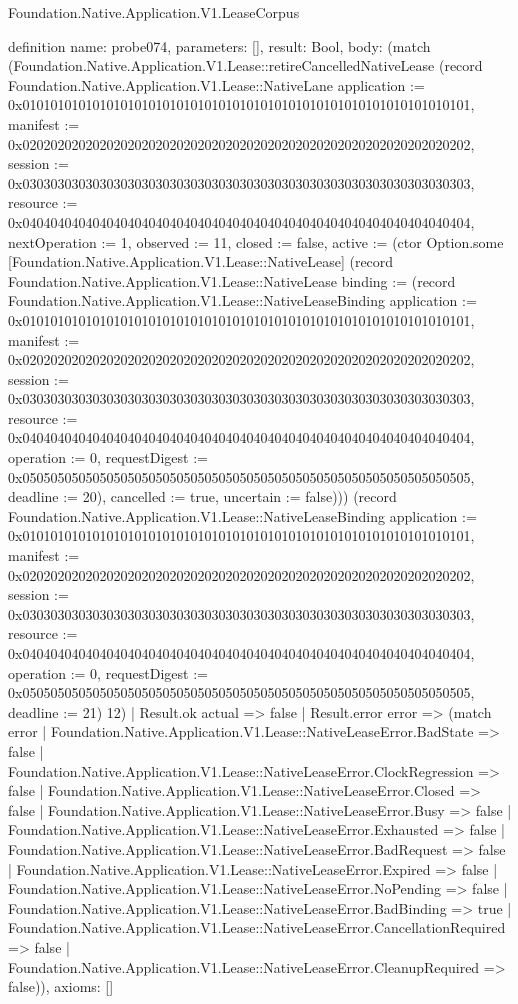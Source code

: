 \begin{lexlean}{Foundation.Native.Application.V1.LeaseCorpus}
\begin{semanticmodule}
definition{
  name: probe074,
  parameters: [],
  result: Bool,
  body: (match (Foundation.Native.Application.V1.Lease::retireCancelledNativeLease (record Foundation.Native.Application.V1.Lease::NativeLane {application := 0x0101010101010101010101010101010101010101010101010101010101010101, manifest := 0x0202020202020202020202020202020202020202020202020202020202020202, session := 0x0303030303030303030303030303030303030303030303030303030303030303, resource := 0x0404040404040404040404040404040404040404040404040404040404040404, nextOperation := 1, observed := 11, closed := false, active := (ctor Option.some [Foundation.Native.Application.V1.Lease::NativeLease] (record Foundation.Native.Application.V1.Lease::NativeLease {binding := (record Foundation.Native.Application.V1.Lease::NativeLeaseBinding {application := 0x0101010101010101010101010101010101010101010101010101010101010101, manifest := 0x0202020202020202020202020202020202020202020202020202020202020202, session := 0x0303030303030303030303030303030303030303030303030303030303030303, resource := 0x0404040404040404040404040404040404040404040404040404040404040404, operation := 0, requestDigest := 0x0505050505050505050505050505050505050505050505050505050505050505, deadline := 20}), cancelled := true, uncertain := false}))}) (record Foundation.Native.Application.V1.Lease::NativeLeaseBinding {application := 0x0101010101010101010101010101010101010101010101010101010101010101, manifest := 0x0202020202020202020202020202020202020202020202020202020202020202, session := 0x0303030303030303030303030303030303030303030303030303030303030303, resource := 0x0404040404040404040404040404040404040404040404040404040404040404, operation := 0, requestDigest := 0x0505050505050505050505050505050505050505050505050505050505050505, deadline := 21}) 12)
    | Result.ok actual => false
    | Result.error error => (match error
      | Foundation.Native.Application.V1.Lease::NativeLeaseError.BadState => false
      | Foundation.Native.Application.V1.Lease::NativeLeaseError.ClockRegression => false
      | Foundation.Native.Application.V1.Lease::NativeLeaseError.Closed => false
      | Foundation.Native.Application.V1.Lease::NativeLeaseError.Busy => false
      | Foundation.Native.Application.V1.Lease::NativeLeaseError.Exhausted => false
      | Foundation.Native.Application.V1.Lease::NativeLeaseError.BadRequest => false
      | Foundation.Native.Application.V1.Lease::NativeLeaseError.Expired => false
      | Foundation.Native.Application.V1.Lease::NativeLeaseError.NoPending => false
      | Foundation.Native.Application.V1.Lease::NativeLeaseError.BadBinding => true
      | Foundation.Native.Application.V1.Lease::NativeLeaseError.CancellationRequired => false
      | Foundation.Native.Application.V1.Lease::NativeLeaseError.CleanupRequired => false)),
  axioms: []
}


\end{semanticmodule}
\end{lexlean}
